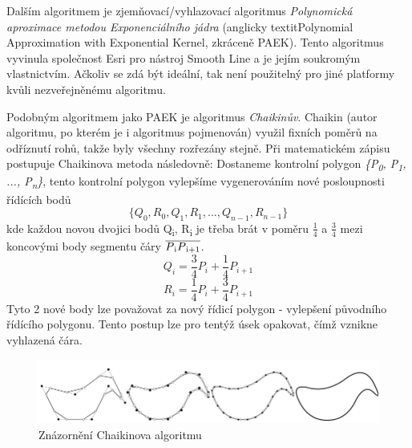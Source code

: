 Dalším algoritmem je zjemňovací/vyhlazovací algoritmus \textit{Polynomická aproximace metodou Exponenciálního jádra}
(anglicky textit{Polynomial Approximation with Exponential Kernel}, zkráceně PAEK).
Tento algoritmus vyvinula společnost Esri pro nástroj Smooth Line a je jejím soukromým vlastnictvím.
Ačkoliv se zdá být ideální, tak není použitelný pro jiné platformy kvůli nezveřejněnému algoritmu.

Podobným algoritmem jako PAEK je algoritmus \textit{Chaikinův}. 
Chaikin (autor algoritmu, po kterém je i algoritmus pojmenován) využil fixních poměrů na odříznutí rohů, takže byly všechny rozřezány stejně. 
Při matematickém zápisu postupuje Chaikinova metoda následovně: Dostaneme kontrolní polygon 
\textit{\{P\textsubscript{0}, P\textsubscript{1}, ..., P\textsubscript{n}\}},
tento kontrolní polygon vylepšíme vygenerováním nové posloupnosti řídících bodů 
\[ \{Q_0, R_0, Q_1, R_1, ...,  Q_{n−1}, R_{n−1}\} \]                                    
kde každou novou dvojici bodů Q\textsubscript{i}, R\textsubscript{i} je třeba brát v poměru \(\frac{1}{4}\)
a \(\frac{3}{4}\) mezi koncovými body segmentu čáry \(\overline{P\textsubscript{i}P\textsubscript{i+1}}\).
\[Q_i = \frac{3}{4}P_i + \frac{1}{4}P_{i+1}\]
\[R_i = \frac{1}{4}P_i + \frac{3}{4}P_{i+1}\]
Tyto 2 nové body lze považovat za nový řídicí polygon - vylepšení původního řídícího polygonu. 
Tento postup lze pro tentýž úsek opakovat, čímž vznikne vyhlazená čára. \cite{chaikin} 

\begin{figure}[H] \centering
    \includegraphics[width=400pt]{./pictures/chaiken.png}
    \caption[Znázornění Chaikinova algoritmu]{Znázornění Chaikinova algoritmu \cite{bayer-douglas}}
	\label{fig:chaiken}              
\end{figure} 
